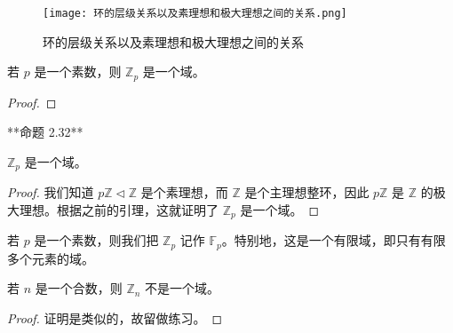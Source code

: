\documentclass[../../main.tex]{subfiles}
\begin{document}
\begin{figure}[H]
\centering
\texttt{[image: 环的层级关系以及素理想和极大理想之间的关系.png]}
\caption{环的层级关系以及素理想和极大理想之间的关系}
\label{figure:环的层级关系以及素理想和极大理想之间的关系}
\end{figure}

\begin{proposition}
若 $p$ 是一个素数，则 $\mathbb{Z}_p$ 是一个域。
\end{proposition}
\begin{proof}

\end{proof}
**命题 2.32** 
\begin{proposition}
$\mathbb{Z}_p$ 是一个域。
\end{proposition}
\begin{proof}
我们知道 $p\mathbb{Z} \lhd \mathbb{Z}$ 是个素理想，而 $\mathbb{Z}$ 是个主理想整环，因此 $p\mathbb{Z}$ 是 $\mathbb{Z}$ 的极大理想。根据之前的引理，这就证明了 $\mathbb{Z}_p$ 是一个域。
\end{proof}

\begin{definition}
若 $p$ 是一个素数，则我们把 $\mathbb{Z}_p$ 记作 $\mathbb{F}_p$。特别地，这是一个有限域，即只有有限多个元素的域。
\end{definition}

\begin{lemma}
若 $n$ 是一个合数，则 $\mathbb{Z}_n$ 不是一个域。
\end{lemma}
\begin{proof}
证明是类似的，故留做练习。
\end{proof}
\end{document}
